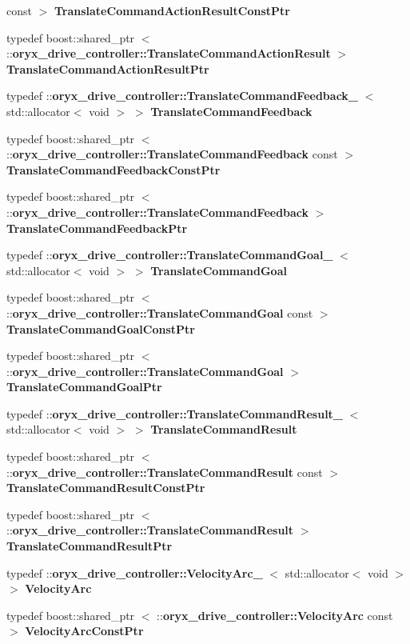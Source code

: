 \begin{DoxyCompactItemize}
const  $>$ {\bf \-Translate\-Command\-Action\-Result\-Const\-Ptr}
\item 
typedef boost\-::shared\-\_\-ptr\*
$<$ \-::{\bf oryx\-\_\-drive\-\_\-controller\-::\-Translate\-Command\-Action\-Result} $>$ {\bf \-Translate\-Command\-Action\-Result\-Ptr}
\item 
typedef \*
\-::{\bf oryx\-\_\-drive\-\_\-controller\-::\-Translate\-Command\-Feedback\-\_\-}\*
$<$ std\-::allocator$<$ void $>$ $>$ {\bf \-Translate\-Command\-Feedback}
\item 
typedef boost\-::shared\-\_\-ptr\*
$<$ \-::{\bf oryx\-\_\-drive\-\_\-controller\-::\-Translate\-Command\-Feedback} \*
const  $>$ {\bf \-Translate\-Command\-Feedback\-Const\-Ptr}
\item 
typedef boost\-::shared\-\_\-ptr\*
$<$ \-::{\bf oryx\-\_\-drive\-\_\-controller\-::\-Translate\-Command\-Feedback} $>$ {\bf \-Translate\-Command\-Feedback\-Ptr}
\item 
typedef \*
\-::{\bf oryx\-\_\-drive\-\_\-controller\-::\-Translate\-Command\-Goal\-\_\-}\*
$<$ std\-::allocator$<$ void $>$ $>$ {\bf \-Translate\-Command\-Goal}
\item 
typedef boost\-::shared\-\_\-ptr\*
$<$ \-::{\bf oryx\-\_\-drive\-\_\-controller\-::\-Translate\-Command\-Goal} \*
const  $>$ {\bf \-Translate\-Command\-Goal\-Const\-Ptr}
\item 
typedef boost\-::shared\-\_\-ptr\*
$<$ \-::{\bf oryx\-\_\-drive\-\_\-controller\-::\-Translate\-Command\-Goal} $>$ {\bf \-Translate\-Command\-Goal\-Ptr}
\item 
typedef \*
\-::{\bf oryx\-\_\-drive\-\_\-controller\-::\-Translate\-Command\-Result\-\_\-}\*
$<$ std\-::allocator$<$ void $>$ $>$ {\bf \-Translate\-Command\-Result}
\item 
typedef boost\-::shared\-\_\-ptr\*
$<$ \-::{\bf oryx\-\_\-drive\-\_\-controller\-::\-Translate\-Command\-Result} \*
const  $>$ {\bf \-Translate\-Command\-Result\-Const\-Ptr}
\item 
typedef boost\-::shared\-\_\-ptr\*
$<$ \-::{\bf oryx\-\_\-drive\-\_\-controller\-::\-Translate\-Command\-Result} $>$ {\bf \-Translate\-Command\-Result\-Ptr}
\item 
typedef \*
\-::{\bf oryx\-\_\-drive\-\_\-controller\-::\-Velocity\-Arc\-\_\-}\*
$<$ std\-::allocator$<$ void $>$ $>$ {\bf \-Velocity\-Arc}
\item 
typedef boost\-::shared\-\_\-ptr\*
$<$ \-::{\bf oryx\-\_\-drive\-\_\-controller\-::\-Velocity\-Arc} \*
const  $>$ {\bf \-Velocity\-Arc\-Const\-Ptr}
\item 

\end{DoxyCompactItemize}
